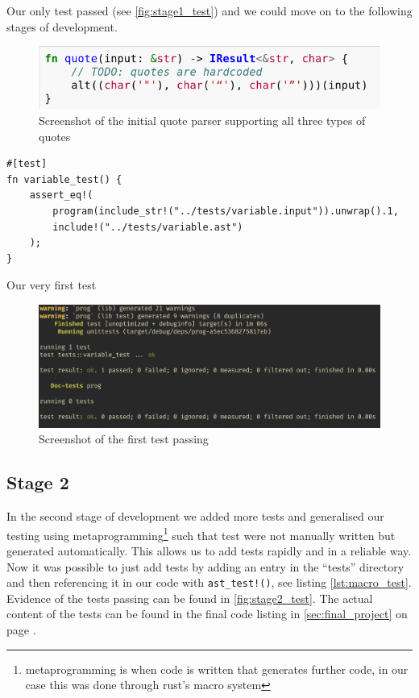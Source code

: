 \documentclass{article}
\begin{document}
Our only test passed (see \autoref{fig:stage1_test}) and we could move on to
the following stages of development.

\begin{figure}
	\includegraphics[width=\textwidth]{initial_quote}
	\caption[Screenshot of the initial quote parser supporting all three types of quotes]{Screenshot\footnotemark{} of the initial quote parser supporting all three types of quotes}
	\label{fig:quote_parser}
\end{figure}


\begin{listing}
	\begin{verbatim}
#[test]
fn variable_test() {
	assert_eq!(
		program(include_str!("../tests/variable.input")).unwrap().1,
		include!("../tests/variable.ast")
	);
}
	\end{verbatim}
	\caption{Our very first test}
	\label{lst:first_test}
\end{listing}

\begin{figure}
	\includegraphics[width=\textwidth]{stage1_test}
	\caption{Screenshot of the first test passing}
	\label{fig:stage1_test}
\end{figure}

\subsection{Stage 2}

In the second stage of development we added more tests and generalised our
testing using metaprogramming\footnote{metaprogramming is when code is written
that generates further code, in our case this was done through rust's macro
system} such that test were not manually written but generated automatically.
This allows us to add tests rapidly and in a reliable way. Now it was possible
to just add tests by adding an entry in the ``tests'' directory and then
referencing it in our code with \texttt{ast_test!()}, see listing
\ref{lst:macro_test}. Evidence of the tests passing can be found in
\autoref{fig:stage2_test}. The actual content of the tests can be found in the
final code listing in \autoref{sec:final_project} on page
\pageref{sec:final_project}.
\end{document}

